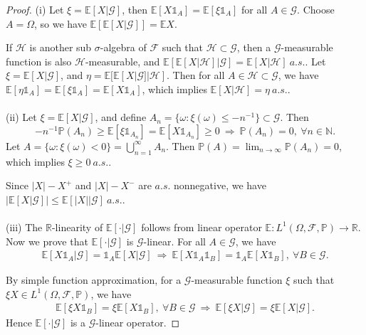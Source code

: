\documentclass{article}
\numberwithin{equation}{section}
\newcommand{\E}{\mathbb{E}}
\renewcommand{\P}{\mathbb{P}}
\theoremstyle{plain}
\theoremstyle{definition}
\begin{document}
\begin{proof}
(i) Let $\xi=\E[X|\mathscr{G}]$, then $\E[X\mathds{1}_A]=\E[\xi\mathds{1}_A]$ for all $A\in\mathscr{G}$. Choose $A=\Omega$, so we have $\E\left[\E\left[X|\mathscr{G}\right]\right]=\E X$. 

If $\mathscr{H}$ is another sub $\sigma$-algebra of $\mathscr{F}$ such that $\mathscr{H}\subset\mathscr{G}$, then a $\mathscr{G}$-measurable function is also $\mathscr{H}$-measurable, and $\E\left[\E\left[X|\mathscr{H}\right]|\mathscr{G}\right]=\E[X|\mathscr{H}]\ a.s.$. Let $\xi=\E[X|\mathscr{G}]$, and $\eta=\E[\E[X|\mathscr{G}]|\mathscr{H}]$. Then for all $A\in\mathscr{H}\subset\mathscr{G}$, we have $\E[\eta\mathds{1}_A]=\E[\xi\mathds{1}_A]=\E[X\mathds{1}_A]$, which implies $\E[X|\mathscr{H}]=\eta\ a.s.$.

\paragraph{}  (ii) Let $\xi=\E[X|\mathscr{G}]$, and define $A_n=\{\omega:\xi(\omega)\leq -n^{-1}\}\subset\mathscr{G}$. Then $$-n^{-1}\P(A_n)\geq\E[\xi\mathds{1}_{A_n}]=\E[X\mathds{1}_{A_n}]\geq 0\ \Rightarrow\ \P(A_n)=0,\ \forall n\in\mathbb{N}.$$
Let $A=\{\omega:\xi(\omega)<0\}=\bigcup_{n=1}^\infty A_n$. Then $\P(A)=\lim_{n\to\infty}\P(A_n)=0$, which implies $\xi\geq 0\ a.s.$.  

Since $\vert X\vert - X^+$ and $\vert X\vert - X^-$ are $a.s.$ nonnegative, we have $\left\vert\E[X|\mathscr{G}]\right\vert\leq\E[\left\vert X\right\vert|\mathscr{G}]\ a.s.$.

\paragraph{}  (iii) The $\mathbb{R}$-linearity of $\E[\cdot|\mathscr{G}]$ follows from linear operator $\E:L^1(\Omega,\mathscr{F},\mathbb{P})\to\mathbb{R}$. Now we prove that $\E[\cdot|\mathscr{G}]$ is $\mathscr{G}$-linear. For all $A\in\mathscr{G}$, we have
\begin{align*}
	\E[X\mathds{1}_A|\mathscr{G}]=\mathds{1}_A\E[X|\mathscr{G}]\ \Rightarrow\ \E[X\mathds{1}_A\mathds{1}_B]=\mathds{1}_A\E[X\mathds{1}_B],\ \forall B\in\mathscr{G}.
\end{align*}

By simple function approximation, for a $\mathscr{G}$-measurable function $\xi$ such that $\xi X\in L^1(\Omega,\mathscr{F},\P)$, we have
\begin{align*}
\E[\xi X\mathds{1}_B]=\xi\E[X\mathds{1}_B],\ \forall B\in\mathscr{G}\ \Rightarrow\ \E[\xi X|\mathscr{G}]=\xi\E[X|\mathscr{G}].
\end{align*}
Hence $\E[\cdot|\mathscr{G}]$ is a $\mathscr{G}$-linear operator. 


\end{proof}
\end{document}
